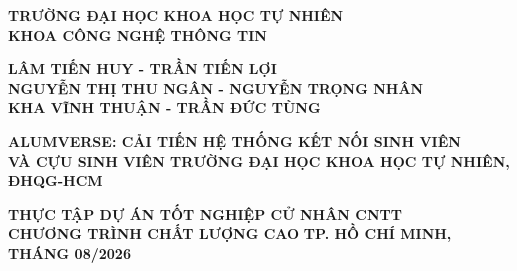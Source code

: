 \documentclass[12pt,a4paper,oneside]{report}
\begin{document}
\begin{titlepage}
\begin{center}
{\fontsize{12}{18}\selectfont \textbf{TRƯỜNG ĐẠI HỌC KHOA HỌC TỰ NHIÊN}}\\[2pt]
{\fontsize{12}{18}\selectfont \textbf{KHOA CÔNG NGHỆ THÔNG TIN}}

\par\vspace{3cm}
{\fontsize{12}{18}\selectfont \textbf{LÂM TIẾN HUY - TRẦN TIẾN LỢI}}\\[3pt]
{\fontsize{12}{18}\selectfont \textbf{NGUYỄN THỊ THU NGÂN - NGUYỄN TRỌNG NHÂN}}\\[3pt]
{\fontsize{12}{18}\selectfont \textbf{KHA VĨNH THUẬN - TRẦN ĐỨC TÙNG}}

\par\vspace{3cm}
{\fontsize{15}{21.5}\selectfont\bfseries ALUMVERSE: CẢI TIẾN HỆ THỐNG KẾT NỐI SINH VIÊN\\[6pt]
VÀ CỰU SINH VIÊN TRƯỜNG ĐẠI HỌC KHOA HỌC TỰ NHIÊN, ĐHQG-HCM}

\par\vspace{3cm}
{\fontsize{12}{18}\selectfont\bfseries THỰC TẬP DỰ ÁN TỐT NGHIỆP CỬ NHÂN CNTT}\\[6pt]
{\fontsize{12}{18}\selectfont\bfseries CHƯƠNG TRÌNH CHẤT LƯỢNG CAO}
\vfill
{\fontsize{12}{18}\selectfont\bfseries TP. HỒ CHÍ MINH, THÁNG 08/2026}
\end{center}
\end{titlepage}
\end{document}

